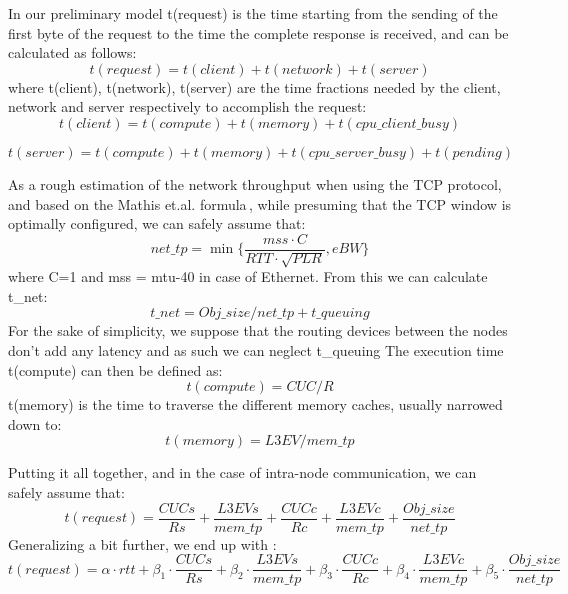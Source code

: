 \documentclass[runningheads]{llncs}
\begin{document}
In our preliminary model t(request) is the time starting from the sending of the first byte of the request to the time the complete response is received, and can be calculated as follows:
\begin{equation}
t(request) = t(client) + t(network) + t(server)
\end{equation}
 where t(client), t(network), t(server) are the time fractions needed by the client, network and server respectively to accomplish the request:
\begin{equation}
t(client) = t(compute) + t(memory) + t(cpu\_client\_busy)
\end{equation}

\begin{equation}
t(server) = t(compute) + t(memory) + t(cpu\_server\_busy) + t(pending)
\end{equation}

As a rough estimation of the network throughput when using the TCP protocol, and based on the Mathis et.al. formula\,\cite{predictability}, while presuming that the TCP window is optimally configured, we can safely assume that:
\begin{equation}
net\_tp= \min\{\frac{mss\cdot C}{RTT \cdot \sqrt{PLR}}, eBW\}
\label{eq:net-tp}
\end{equation}
where C=1 and mss = mtu-40 in case of Ethernet.
From this we can calculate t\_net:
\begin{equation}
 t\_net=Obj\_size / net\_tp + t\_queuing
\end{equation}
For the sake of simplicity, we suppose that the routing devices between the nodes don’t add any latency and as such we can neglect t\_queuing
The execution time t(compute) can then be defined as:
\begin{equation}
t(compute) = CUC /R
\end{equation}
t(memory) is the time to traverse the different memory caches, usually narrowed down to:
\begin{equation}
t(memory)=L3EV/mem\_tp
\end{equation}

Putting it all together, and in the case of intra-node communication, we can safely assume that:
\begin{equation}
t(request)=\frac{CUCs}{Rs}+\frac{L3EVs}{mem\_tp}+\frac{CUCc}{Rc}+\frac{L3EVc}{mem\_tp}+\frac{Obj\_size}{net\_tp}
\end{equation}
Generalizing a bit further, we end up with :
\begin{equation}
\label{eq:model}
t(request)=\alpha\cdot rtt+\beta_1\cdot\frac{CUCs}{Rs}+\beta_2\cdot\frac{L3EVs}{mem\_tp}+\beta_3\cdot\frac{CUCc}{Rc}+\beta_4\cdot\frac{L3EVc}{mem\_tp}+\beta_5\cdot\frac{Obj\_size}{net\_tp}
\end{equation}
\end{document}
